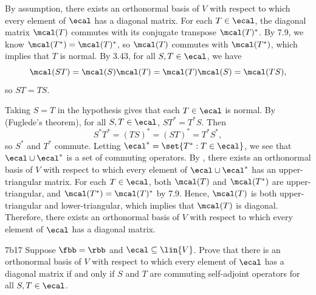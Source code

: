 \begin{soliff}
    \rightimp By assumption, there exists an orthonormal basis of $V$ with respect to which every element of $\ecal$ has a diagonal matrix.
    For each $T \in \ecal$, the diagonal matrix $\mcal(T)$ commutes with its conjugate transpose $\mcal(T)^\ast$.
    By 7.9, we know $\mcal(T^\ast) = \mcal(T)^\ast$, so $\mcal(T)$ commutes with $\mcal(T^\ast)$, which implies that $T$ is normal.
    By 3.43, for all $S, T \in \ecal$, we have
    \[
        \mcal(ST) = \mcal(S)\mcal(T) = \mcal(T)\mcal(S) = \mcal(TS),
    \]
    so $ST = TS$.

    \leftimp Taking $S = T$ in the hypothesis gives that each $T \in \ecal$ is normal.
    By  (Fuglede's theorem), for all $S, T \in \ecal$, $S T^\ast = T^\ast S$.
    Then
    \[
        S^\ast T^\ast = (T S)^\ast = (S T)^\ast = T^\ast S^\ast,
    \]
    so $S^\ast$ and $T^\ast$ commute.
    Letting $\ecal^\ast = \set{T^\ast : T \in \ecal}$, we see that $\ecal \cup \ecal^\ast$ is a set of commuting operators.
    By , there exists an orthonormal basis of $V$ with respect to which every element of $\ecal \cup \ecal^\ast$ has an upper-triangular matrix.
    For each $T \in \ecal$, both $\mcal(T)$ and $\mcal(T^\ast)$ are upper-triangular, and $\mcal(T^\ast) = \mcal(T)^\ast$ by 7.9.
    Hence, $\mcal(T)$ is both upper-triangular and lower-triangular, which implies that $\mcal(T)$ is diagonal.
    Therefore, there exists an orthonormal basis of $V$ with respect to which every element of $\ecal$ has a diagonal matrix.
\end{soliff}

\begin{exercise}{7b17}
    Suppose $\fbb = \rbb$ and $\ecal \subseteq \lin{V}$.
    Prove that there is an orthonormal basis of $V$ with respect to which every element of $\ecal$ has a diagonal matrix if and only if $S$ and $T$ are commuting self-adjoint operators for all $S, T \in \ecal$.
    
\end{exercise}

